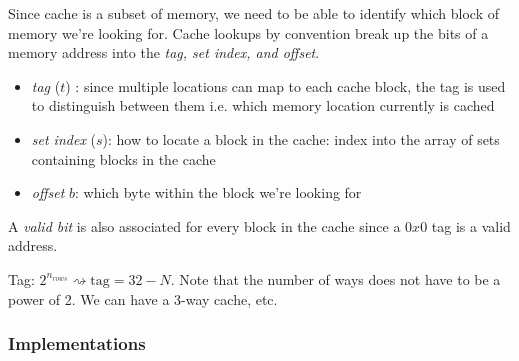 \documentclass[../notes.tex]{subfiles}
\begin{document}
Since cache is a subset of memory, we need to be able to identify which block of memory we're looking for.
Cache lookups by convention break up the bits of a memory address into the \textit{tag, set index, and offset}. 

\begin{itemize}
	\item \textit{tag} ($ t $) : since multiple locations can map to each cache block, the tag is used to distinguish between them i.e. which memory location currently is cached
	\item \textit{set index} ($ s $): how to locate a block in the cache: index into the array of sets containing blocks in the cache
	\item \textit{offset} $ b $:  which byte within the block we're looking for
\end{itemize}

A \textit{valid bit} is also associated for every block in the cache since a $ 0x0 $ tag is a valid address.



Tag: $ 2^{n_{rows}} \rightsquigarrow \text{tag} = 32-N$.
Note that the number of ways does not have to be a power of 2. We can have a 3-way cache, etc.

\subsubsection{Implementations}
\end{document}

